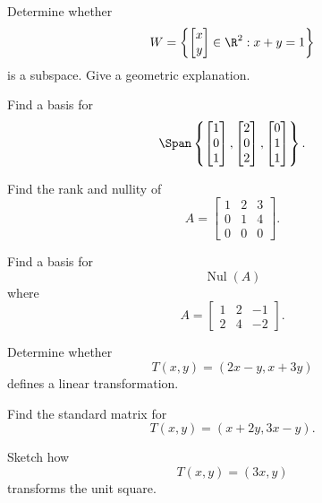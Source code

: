 \begin{exercise}[2]
Determine whether
\[ W=\left\{
\begin{bmatrix}x\\y\end{bmatrix}\in\R^2:x+y=1
\right\} \]
is a subspace. Give a geometric explanation.
\end{exercise}

\begin{exercise}[2]
Find a basis for
\[ \Span\left\{
\begin{bmatrix}1\\0\\1\end{bmatrix},
\begin{bmatrix}2\\0\\2\end{bmatrix},
\begin{bmatrix}0\\1\\1\end{bmatrix}
\right\}. \]
\end{exercise}

\begin{exercise}[2]
Find the rank and nullity of
\[ A=\begin{bmatrix}1&2&3\\0&1&4\\0&0&0\end{bmatrix}. \]
\end{exercise}

\begin{exercise}[2]
Find a basis for
\[ \operatorname{Nul}(A) \]
where
\[ A=\begin{bmatrix}1&2&-1\\2&4&-2\end{bmatrix}. \]
\end{exercise}

\begin{exercise}[2]
Determine whether
\[ T(x,y)=(2x-y,x+3y) \]
defines a linear transformation.
\end{exercise}

\begin{exercise}[2]
Find the standard matrix for
\[ T(x,y)=(x+2y,3x-y). \]
\end{exercise}

\begin{exercise}[2]
Sketch how
\[ T(x,y)=(3x,y) \]
transforms the unit square.
\end{exercise}

